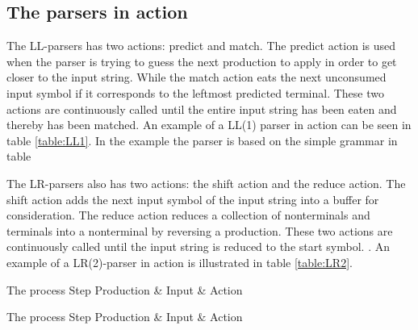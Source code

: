\subsection{The parsers in action} 
The LL-parsers has two actions: predict and match. The predict action is used when the parser is trying to guess the next production to apply in order to get closer to the input string. While the match action eats the next unconsumed input symbol if it corresponds to the leftmost predicted terminal. These two actions are continuously called until the entire input string has been eaten and thereby has been matched. An example of a LL(1) parser in action can be seen in table \ref{table:LL1}. In the example the parser is based on the simple grammar in table 

\begin{centering}
\begin{ebnf}
\end{ebnf}
\end{centering}
The LR-parsers also has two actions: the shift action and the reduce action. The shift action adds the next input symbol of the input string into a buffer for consideration. The reduce action reduces a collection of nonterminals and terminals into a nonterminal by reversing a production. These two actions are
continuously called until the input string is reduced to the start symbol. \cite{LL(1)andLR(2)inaction}. An example of a LR(2)-parser in action is illustrated in table \ref{table:LR2}.

	      {The process                                              }
{Step  	 }{Production & Input       & Action                        }{
}

	      {The process}
{Step  	 }{Production & Input       & Action                     }{
}

